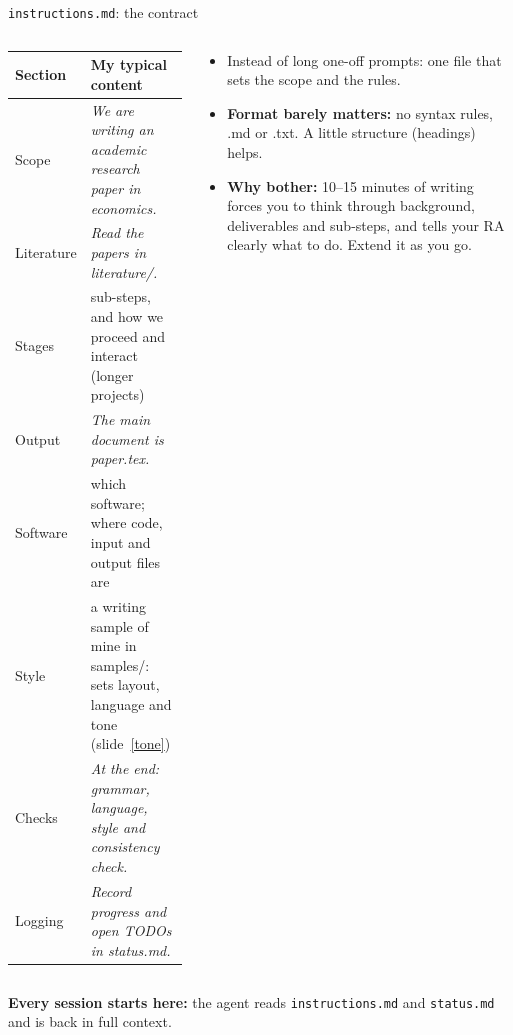 \documentclass[aspectratio=169,11pt]{beamer}
\newcommand{\file}[1]{\texttt{#1}}
\newcommand{\icon}[1]{\textcolor{accent}{#1}}
\begin{document}
\begin{frame}{\file{instructions.md}: the contract}
  \label{instructions}
  \begin{columns}[T]
    \begin{column}{0.6\textwidth}
      \scriptsize
      \renewcommand{\arraystretch}{1.1}
      \begin{tabularx}{\linewidth}{@{}l Y@{}}
        \toprule
        \textbf{Section} & \textbf{My typical content} \\
        \midrule
        Scope      & \textit{We are writing an academic research paper in economics.} \\
        Literature & \textit{Read the papers in literature/.} \\
        Stages     & sub-steps, and how we proceed and interact (longer projects) \\
        Output     & \textit{The main document is paper.tex.} \\
        Software   & which software; where code, input and output files are \\
        Style      & a writing sample of mine in samples/: sets layout, language and tone (slide~\ref{tone}) \\
        Checks     & \textit{At the end: grammar, language, style and consistency check.} \\
        Logging    & \textit{Record progress and open TODOs in status.md.} \\
        \bottomrule
      \end{tabularx}
    \end{column}
    \begin{column}{0.36\textwidth}
      \begin{itemize}\footnotesize
        \item Instead of long one-off prompts: one file that sets the scope and the rules.
        \item \textbf{Format barely matters:} no syntax rules, .md or .txt. A little structure (headings) helps.
        \item \textbf{Why bother:} 10--15 minutes of writing forces you to think through background, deliverables and sub-steps, and tells your RA clearly what to do. Extend it as you go.
      \end{itemize}
    \end{column}
  \end{columns}
  \begin{keybox}
    \icon{\faRedo}\enspace\textbf{Every session starts here:} the agent reads \file{instructions.md} and \file{status.md} and is back in full context.
  \end{keybox}
\end{frame}
\end{document}
